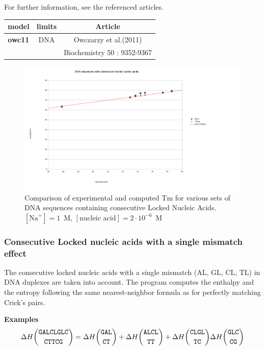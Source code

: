 \documentclass{article}
\begin{document}
For further information, see the referenced articles.

\begin{table}[hc]
\begin{tabular}[h]{| c | c | c |}
\textbf{model} & \textbf{limits} & \textbf{Article} \\
\hline
\textbf{owc11} & DNA & Owczarzy et al.(2011)\\
 & & Biochemistry 50 : 9352-9367\\
\hline
\end{tabular}
\end{table}

\begin{figure}[h]
\includegraphics[width=1\linewidth]{images/TandemLockedNucleicAcids}
\caption{Comparison of experimental and computed Tm for various sets of
 DNA sequences containing consecutive Locked Nucleic Acids. $[\mbox{Na}^+] = 1$~M, $[\mbox{nucleic acid}] = 2\cdot{}10^{-6}$~M}
\end{figure}

\pagebreak
\subsubsection{Consecutive Locked nucleic acids with a single mismatch effect}

The consecutive locked nucleic acids with a single mismatch (AL, GL, CL, TL) in DNA duplexes are taken into account.
The program computes the enthalpy and the entropy following the same nearest-neighbor formula as for perfectly matching Crick's pairs.

\textbf{Examples}
\begin{multline*}
\Delta H {\mbox{\texttt{GALCLGLC}} \choose \mbox{\texttt{CTTCG}}} = 
\Delta H {\mbox{\texttt{GAL}} \choose \mbox{\texttt{CT}}} +
\Delta H {\mbox{\texttt{ALCL}} \choose \mbox{\texttt{TT}}} +
\Delta H {\mbox{\texttt{CLGL}} \choose \mbox{\texttt{TC}}} 
\Delta H {\mbox{\texttt{GLC}} \choose \mbox{\texttt{CG}}} \\ 
\end{multline*}
       
\end{document}
